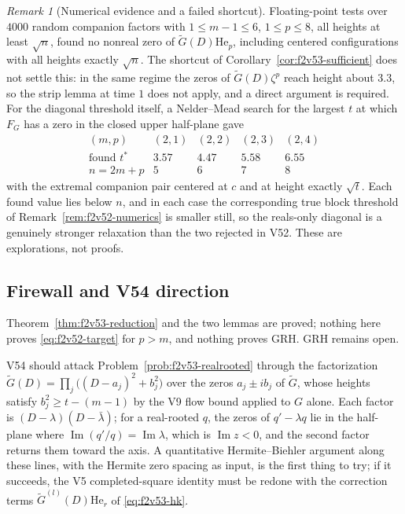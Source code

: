 \documentclass[11pt]{article}
\theoremstyle{definition}
\theoremstyle{remark}
\newtheorem{remark}[theorem]{Remark}
\begin{document}
\begin{remark}[Numerical evidence and a failed shortcut]
\label{rem:f2v53-numerics}
Floating-point tests over \(4000\) random companion factors with
\(1\le m-1\le6\), \(1\le p\le8\), all heights at least \(\sqrt n\),
found no nonreal zero of \(\widetilde G(D)\mathrm{He}_p\), including
centered configurations with all heights exactly \(\sqrt n\).  The
shortcut of Corollary~\ref{cor:f2v53-sufficient} does not settle this:
in the same regime the zeros of \(\widetilde G(D)\zeta^p\) reach height
about \(3.3\), so the strip lemma at time \(1\) does not apply, and a
direct argument is required.  For the diagonal threshold itself, a
Nelder--Mead search for the largest \(t\) at which \(F_G\) has a zero in
the closed upper half-plane gave
\[
\begin{array}{c|cccc}
(m,p)&(2,1)&(2,2)&(2,3)&(2,4)\\ \hline
\text{found }t^*&3.57&4.47&5.58&6.55\\
n=2m+p&5&6&7&8
\end{array}
\]
with the extremal companion pair centered at \(c\) and at height exactly
\(\sqrt t\).  Each found value lies below \(n\), and in each case the
corresponding true block threshold of Remark~\ref{rem:f2v52-numerics}
is smaller still, so the reals-only diagonal is a genuinely stronger
relaxation than the two rejected in V52.  These are explorations, not
proofs.
\end{remark}

\subsection*{Firewall and V54 direction}
\label{fire:f2v53}
Theorem~\ref{thm:f2v53-reduction} and the two lemmas are proved; nothing
here proves \eqref{eq:f2v52-target} for \(p>m\), and nothing proves GRH.
GRH remains open.

V54 should attack Problem~\ref{prob:f2v53-realrooted} through the
factorization
\(\widetilde G(D)=\prod_j\bigl((D-a_j)^2+b_j^2\bigr)\) over the zeros
\(a_j\pm ib_j\) of \(\widetilde G\), whose heights satisfy
\(b_j^2\ge t-(m-1)\) by the V9 flow bound applied to \(G\) alone.  Each
factor is \((D-\lambda)(D-\bar\lambda)\); for a real-rooted \(q\), the
zeros of \(q'-\lambda q\) lie in the half-plane where
\(\operatorname{Im}(q'/q)=\operatorname{Im}\lambda\), which is
\(\operatorname{Im}z<0\), and the second factor returns them toward the
axis.  A quantitative Hermite--Biehler argument along these lines, with
the Hermite zero spacing as input, is the first thing to try; if it
succeeds, the V5 completed-square identity must be redone with the
correction terms \(\widetilde G^{(l)}(D)\mathrm{He}_{r}\) of
\eqref{eq:f2v53-hk}.
\end{document}
